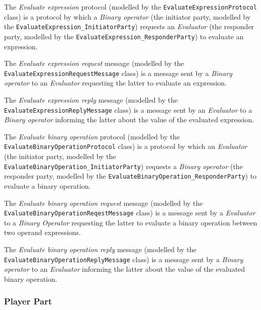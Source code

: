 The \textit{Evaluate expression} protocol (modelled by the \texttt{EvaluateExpressionProtocol} class) is a protocol by which a \textit{Binary operator} (the initiator party, modelled by the \texttt{EvaluateExpression\_InitiatorParty}) requests an \textit{Evaluator} (the responder party, modelled by the \texttt{EvaluateExpression\_ResponderParty}) to evaluate an expression.

The \textit{Evaluate expression request} message (modelled by the \texttt{EvaluateExpressionRequestMessage} class) is a message sent by a \textit{Binary operator} to an \textit{Evaluator} requesting the latter to evaluate an expression.

The \textit{Evaluate expression reply} message (modelled by the \texttt{EvaluateExpressionReplyMessage} class) is a message sent by an \textit{Evaluator} to a \textit{Binary operator} informing the latter about the value of the evaluated expression.

The \textit{Evaluate binary operation} protocol (modelled by the \texttt{EvaluateBinaryOperationProtocol} class) is a protocol by which an \textit{Evaluator} (the initiator party, modelled by the \texttt{EvaluateBinaryOperation\_InitiatorParty}) requests a \textit{Binary operator} (the responder party, modelled by the \texttt{EvaluateBinaryOperation\_ResponderParty}) to evaluate a binary operation.

The \textit{Evaluate binary operation request} message (modelled by the \texttt{EvaluateBinaryOperationReqestMessage} class) is a message sent by a \textit{Evaluator} to a \textit{Binary Operator} requesting the latter to evaluate a binary operation between two operand expressions.

The \textit{Evaluate binary operation reply} message (modelled by the \texttt{EvaluateBinaryOperationReplyMessage} class) is a message sent by a \textit{Binary operator} to an \textit{Evaluator} informing the latter about the value of the evaluated binary operation.

\subsubsection*{Player Part}

